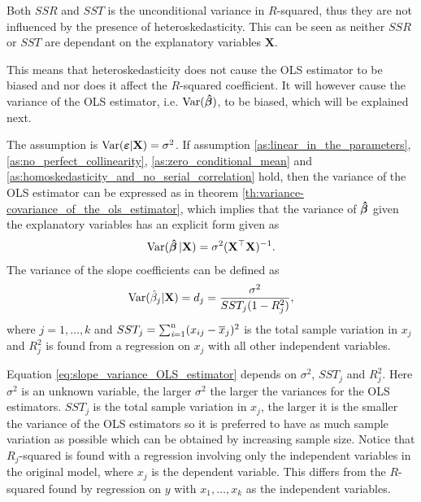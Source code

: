 Both $SSR$ and $SST$ is the unconditional variance in $R$-squared, thus they are not influenced by the presence of heteroskedasticity. 
This can be seen as neither $SSR$ or $SST$ are dependant on the explanatory variables $\textbf{X}$.

This means that heteroskedasticity does not cause the OLS estimator to be biased and nor does it affect the $R$-squared coefficient. 
It will however cause the variance of the OLS estimator, i.e. $\operatorname{\text{Var}}(\operatorname{\boldsymbol{\hat{\beta}}})$, to be biased, which will be explained next.  

The \homo assumption is $\operatorname{\text{Var}}(\boldsymbol{\varepsilon} | \mathbf{X}) = \sigma^2$. 
If assumption \ref{as:linear_in_the_parameters}, \ref{as:no_perfect_collinearity}, \ref{as:zero_conditional_mean} and \ref{as:homoskedasticity_and_no_serial_correlation} hold, then the variance of the OLS estimator can be expressed as in theorem \ref{th:variance-covariance_of_the_ols_estimator}, which implies that the variance of $\operatorname{\boldsymbol{\hat{\beta}}}$ given the explanatory variables has an explicit form given as
\begin{align*}
    \operatorname{\text{Var}}(\operatorname{\boldsymbol{\hat{\beta}}} | \mathbf{X}) = \sigma^2(\mathbf{X}^\top\mathbf{X})^{-1}.
\end{align*}
The variance of the slope coefficients can be defined as
\begin{align}\label{eq:slope_variance_OLS_estimator}
    \operatorname{\text{Var}}(\hat{\beta}_j|\mathbf{X}) = d_j = \dfrac{\sigma^2}{SST_j(1- R_j^2)},
\end{align}
where $j = 1, \ldots, k$ and $SST_j = \operatorname{\sum_{\textit{i}=1}^n} (x_{ij} - \overline{x}_j)^2$ is the total sample variation in $x_j$ and $R^2_j$ is found from a regression on $x_j$ with all other independent variables. 

Equation \eqref{eq:slope_variance_OLS_estimator} depends on $\sigma^2$, $SST_j$ and $R^2_j$.
Here $\sigma^2$ is an unknown variable, the larger $\sigma^2$ the larger the variances for the OLS estimators. 
$SST_j$ is the total sample variation in $x_j$, the larger it is the smaller the variance of the OLS estimators so it is preferred to have as much sample variation as possible which can be obtained by increasing sample size. 
Notice that $R_j$-squared is found with a regression involving only the independent variables in the original model, where $x_j$ is the dependent variable. 
This differs from the $R$-squared found by regression on $y$ with $x_1, \ldots, x_k$ as the independent variables. 

